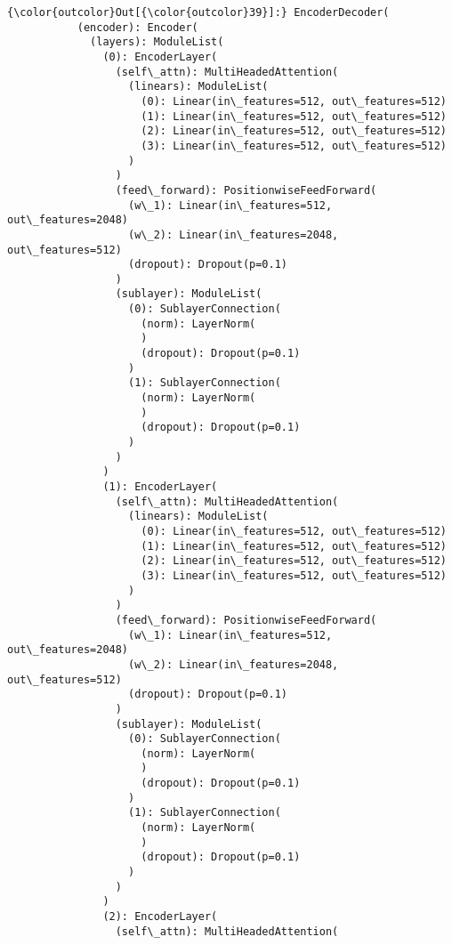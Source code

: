 \documentclass[11pt]{article}
\begin{document}
\begin{Verbatim}[commandchars=\\\{\}]
{\color{outcolor}Out[{\color{outcolor}39}]:} EncoderDecoder(
           (encoder): Encoder(
             (layers): ModuleList(
               (0): EncoderLayer(
                 (self\_attn): MultiHeadedAttention(
                   (linears): ModuleList(
                     (0): Linear(in\_features=512, out\_features=512)
                     (1): Linear(in\_features=512, out\_features=512)
                     (2): Linear(in\_features=512, out\_features=512)
                     (3): Linear(in\_features=512, out\_features=512)
                   )
                 )
                 (feed\_forward): PositionwiseFeedForward(
                   (w\_1): Linear(in\_features=512, out\_features=2048)
                   (w\_2): Linear(in\_features=2048, out\_features=512)
                   (dropout): Dropout(p=0.1)
                 )
                 (sublayer): ModuleList(
                   (0): SublayerConnection(
                     (norm): LayerNorm(
                     )
                     (dropout): Dropout(p=0.1)
                   )
                   (1): SublayerConnection(
                     (norm): LayerNorm(
                     )
                     (dropout): Dropout(p=0.1)
                   )
                 )
               )
               (1): EncoderLayer(
                 (self\_attn): MultiHeadedAttention(
                   (linears): ModuleList(
                     (0): Linear(in\_features=512, out\_features=512)
                     (1): Linear(in\_features=512, out\_features=512)
                     (2): Linear(in\_features=512, out\_features=512)
                     (3): Linear(in\_features=512, out\_features=512)
                   )
                 )
                 (feed\_forward): PositionwiseFeedForward(
                   (w\_1): Linear(in\_features=512, out\_features=2048)
                   (w\_2): Linear(in\_features=2048, out\_features=512)
                   (dropout): Dropout(p=0.1)
                 )
                 (sublayer): ModuleList(
                   (0): SublayerConnection(
                     (norm): LayerNorm(
                     )
                     (dropout): Dropout(p=0.1)
                   )
                   (1): SublayerConnection(
                     (norm): LayerNorm(
                     )
                     (dropout): Dropout(p=0.1)
                   )
                 )
               )
               (2): EncoderLayer(
                 (self\_attn): MultiHeadedAttention(

\end{Verbatim}
\end{document}
